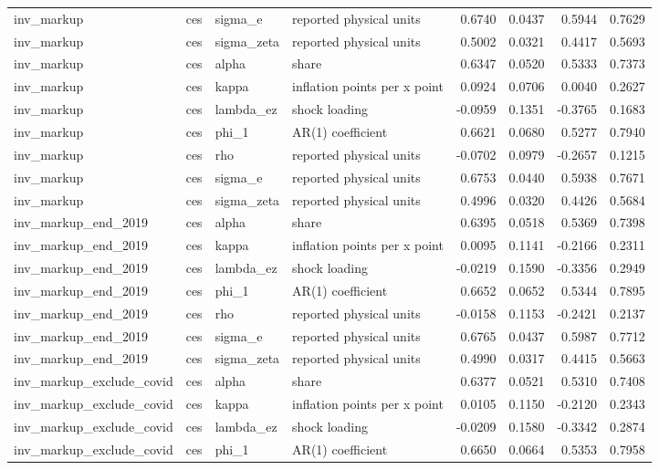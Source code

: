 \begin{tabular}{llllrrrr}
inv\_markup & ces & sigma\_e & reported physical units & 0.6740 & 0.0437 & 0.5944 & 0.7629 \\
inv\_markup & ces & sigma\_zeta & reported physical units & 0.5002 & 0.0321 & 0.4417 & 0.5693 \\
inv\_markup & ces & alpha & share & 0.6347 & 0.0520 & 0.5333 & 0.7373 \\
inv\_markup & ces & kappa & inflation points per x point & 0.0924 & 0.0706 & 0.0040 & 0.2627 \\
inv\_markup & ces & lambda\_ez & shock loading & -0.0959 & 0.1351 & -0.3765 & 0.1683 \\
inv\_markup & ces & phi\_1 & AR(1) coefficient & 0.6621 & 0.0680 & 0.5277 & 0.7940 \\
inv\_markup & ces & rho & reported physical units & -0.0702 & 0.0979 & -0.2657 & 0.1215 \\
inv\_markup & ces & sigma\_e & reported physical units & 0.6753 & 0.0440 & 0.5938 & 0.7671 \\
inv\_markup & ces & sigma\_zeta & reported physical units & 0.4996 & 0.0320 & 0.4426 & 0.5684 \\
inv\_markup\_end\_2019 & ces & alpha & share & 0.6395 & 0.0518 & 0.5369 & 0.7398 \\
inv\_markup\_end\_2019 & ces & kappa & inflation points per x point & 0.0095 & 0.1141 & -0.2166 & 0.2311 \\
inv\_markup\_end\_2019 & ces & lambda\_ez & shock loading & -0.0219 & 0.1590 & -0.3356 & 0.2949 \\
inv\_markup\_end\_2019 & ces & phi\_1 & AR(1) coefficient & 0.6652 & 0.0652 & 0.5344 & 0.7895 \\
inv\_markup\_end\_2019 & ces & rho & reported physical units & -0.0158 & 0.1153 & -0.2421 & 0.2137 \\
inv\_markup\_end\_2019 & ces & sigma\_e & reported physical units & 0.6765 & 0.0437 & 0.5987 & 0.7712 \\
inv\_markup\_end\_2019 & ces & sigma\_zeta & reported physical units & 0.4990 & 0.0317 & 0.4415 & 0.5663 \\
inv\_markup\_exclude\_covid & ces & alpha & share & 0.6377 & 0.0521 & 0.5310 & 0.7408 \\
inv\_markup\_exclude\_covid & ces & kappa & inflation points per x point & 0.0105 & 0.1150 & -0.2120 & 0.2343 \\
inv\_markup\_exclude\_covid & ces & lambda\_ez & shock loading & -0.0209 & 0.1580 & -0.3342 & 0.2874 \\
inv\_markup\_exclude\_covid & ces & phi\_1 & AR(1) coefficient & 0.6650 & 0.0664 & 0.5353 & 0.7958 \\

\end{tabular}
